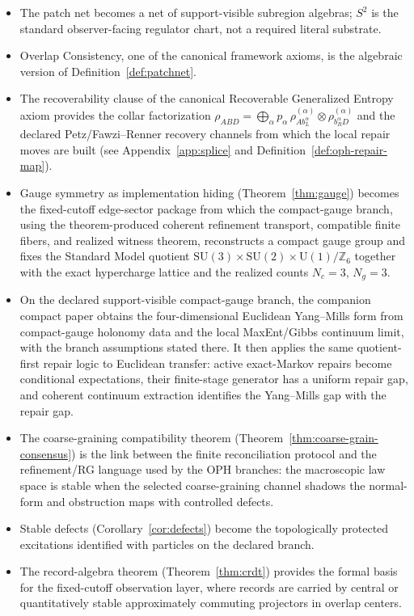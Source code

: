\documentclass[11pt]{article}
\theoremstyle{remark}
\theoremstyle{plain}
\begin{document}
\begin{itemize}
\item The patch net becomes a net of support-visible subregion algebras; \(S^2\) is the standard
observer-facing regulator chart, not a required literal substrate.
\item Overlap Consistency, one of the canonical framework axioms, is the algebraic version of Definition~\ref{def:patchnet}.
\item The recoverability clause of the canonical Recoverable Generalized Entropy axiom provides the collar factorization $\rho_{ABD} = \bigoplus_\alpha p_\alpha\,\rho^{(\alpha)}_{Ab_L^\alpha}\otimes\rho^{(\alpha)}_{b_R^\alpha D}$ and the declared Petz/Fawzi--Renner recovery channels from which the local repair moves are built (see Appendix~\ref{app:splice} and Definition~\ref{def:oph-repair-map}).
\item Gauge symmetry as implementation hiding (Theorem~\ref{thm:gauge}) becomes the fixed-cutoff edge-sector package from which the compact-gauge branch, using the theorem-produced coherent refinement transport, compatible finite fibers, and realized witness theorem, reconstructs a compact gauge group and fixes the Standard Model quotient $\mathrm{SU}(3)\times\mathrm{SU}(2)\times\mathrm{U}(1)/\mathbb{Z}_6$ together with the exact hypercharge lattice and the realized counts \(N_c=3\), \(N_g=3\).
\item On the declared support-visible compact-gauge branch, the companion compact paper obtains
the four-dimensional Euclidean Yang--Mills form from compact-gauge holonomy data and the local
MaxEnt/Gibbs continuum limit, with the branch assumptions stated there. It then applies the same
quotient-first repair logic to Euclidean transfer: active exact-Markov repairs become conditional
expectations, their finite-stage generator has a uniform repair gap, and coherent continuum
extraction identifies the Yang--Mills gap with the repair gap.
\item The coarse-graining compatibility theorem (Theorem~\ref{thm:coarse-grain-consensus}) is the link between the finite reconciliation protocol and the refinement/RG language used by the OPH branches: the macroscopic law space is stable when the selected coarse-graining channel shadows the normal-form and obstruction maps with controlled defects.
\item Stable defects (Corollary~\ref{cor:defects}) become the topologically protected excitations identified with particles on the declared branch.
\item The record-algebra theorem (Theorem~\ref{thm:crdt}) provides the formal basis for the fixed-cutoff observation layer, where records are carried by central or quantitatively stable approximately commuting projectors in overlap centers.
\end{itemize}
\end{document}
